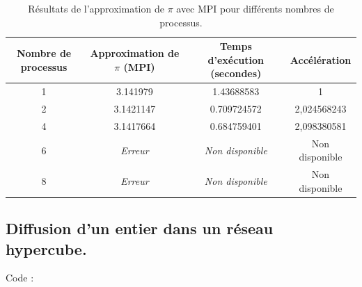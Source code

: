 \documentclass[a4paper,13pt]{book}
\begin{document}
\begin{table}[h!]
    \centering
    \begin{tabular}{|c|c|c|c|}
    \toprule
    \hline
    \textbf{Nombre de processus} & \textbf{Approximation de $\pi$ (MPI)} & \textbf{Temps d'exécution (secondes)} & \textbf{Accélération}\\
    \midrule    
    \hline
    1                           & 3.141979                              & 1.43688583   & 1                              \\\hline
    2                           & 3.1421147                              & 0.709724572     &    2,024568243                       \\\hline
    4                           & 3.1417664                              & 0.684759401      &     2,098380581                    \\\hline
    6                           & \textit{Erreur}                       & \textit{Non disponible}    & Non disponible            \\\hline
    8                           & \textit{Erreur}                       & \textit{Non disponible}    & Non disponible           \\\hline
    \bottomrule
    \end{tabular}
    \caption{Résultats de l'approximation de $\pi$ avec MPI pour différents nombres de processus.}
    \label{tab:pi_mpi_py}
    \end{table}

\subsection{Diffusion d'un entier dans un réseau hypercube.  }
Code :  \\
\end{document}

